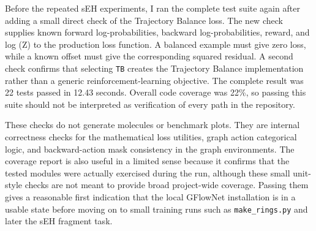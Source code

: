\documentclass{article}
\begin{document}




Before the repeated sEH experiments, I ran the complete test suite again after adding a small direct check of the Trajectory Balance loss. The new check supplies known forward log-probabilities, backward log-probabilities, reward, and log (Z) to the production loss function. A balanced example must give zero loss, while a known offset must give the corresponding squared residual. A second check confirms that selecting \texttt{TB} creates the Trajectory Balance implementation rather than a generic reinforcement-learning objective. The complete result was 22 tests passed in 12.43 seconds. Overall code coverage was 22\%, so passing this suite should not be interpreted as verification of every path in the repository.

These checks do not generate molecules or benchmark plots. They are internal correctness checks for the mathematical loss utilities, graph action categorical logic, and backward-action mask consistency in the graph environments. The coverage report is also useful in a limited sense because it confirms that the tested modules were actually exercised during the run, although these small unit-style checks are not meant to provide broad project-wide coverage. Passing them gives a reasonable first indication that the local GFlowNet installation is in a usable state before moving on to small training runs such as \texttt{make\_rings.py} and later the sEH fragment task.
\end{document}
